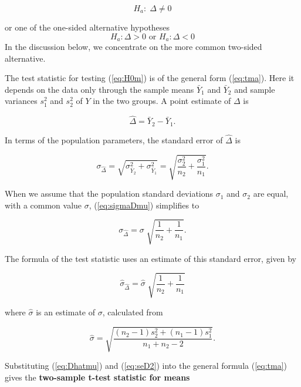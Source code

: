 \documentclass[11pt,a4paper,openany]{book}
\begin{document}
\begin{equation}H_{a}: \; \Delta\ne 0\label{eq:Hatwom}\end{equation}

or one of the one-sided alternative hypotheses
\[H_{a}:  \Delta> 0 \text{ or } H_{a}:  \Delta< 0\] In the discussion
below, we concentrate on the more common two-sided alternative.

The test statistic for testing (\ref{eq:H0m}) is of the general form
(\ref{eq:tma}). Here it depends on the data only through the sample
means \(\bar{Y}_{1}\) and \(\bar{Y}_{2}\) and sample variances
\(s_{1}^{2}\) and \(s_{2}^{2}\) of \(Y\) in the two groups. A point
estimate of \(\Delta\) is

\begin{equation}\hat{\Delta}=\bar{Y}_{2}-\bar{Y}_{1}.
\label{eq:Dhatmu}\end{equation}

In terms of the population parameters, the standard error of
\(\hat{\Delta}\) is

\begin{equation}\sigma_{\hat{\Delta}}=
\sqrt{\sigma^{2}_{\bar{Y}_{2}}+
\sigma^{2}_{\bar{Y}_{1}}}=
\sqrt{
\frac{\sigma^{2}_{2}}{n_{2}}+
\frac{\sigma^{2}_{1}}{n_{1}}
}.
\label{eq:sigmaDmu}\end{equation}

When we assume that the population standard deviations \(\sigma_{1}\)
and \(\sigma_{2}\) are equal, with a common value \(\sigma\),
(\ref{eq:sigmaDmu}) simplifies to

\begin{equation}\sigma_{\hat{\Delta}} =
\sigma\; \sqrt{
\frac{1}{n_{2}}+
\frac{1}{n_{1}}
}.
\label{eq:seDpop}\end{equation}

The formula of the test statistic uses an estimate of this standard
error, given by

\begin{equation}\hat{\sigma}_{\hat{\Delta}} =
\hat{\sigma} \; \sqrt{\frac{1}{n_{2}}+\frac{1}{n_{1}}}
\label{eq:seD2}\end{equation}

where \(\hat{\sigma}\) is an estimate of \(\sigma\), calculated from

\begin{equation}\hat{\sigma}=
\sqrt{\frac{(n_{2}-1)s^{2}_{2}+(n_{1}-1)s^{2}_{1}}{n_{1}+n_{2}-2}}.
\label{eq:sehatjoint}\end{equation}

Substituting (\ref{eq:Dhatmu}) and (\ref{eq:seD2}) into the general
formula (\ref{eq:tma}) gives the \textbf{two-sample t-test statistic for
means}
\end{document}
